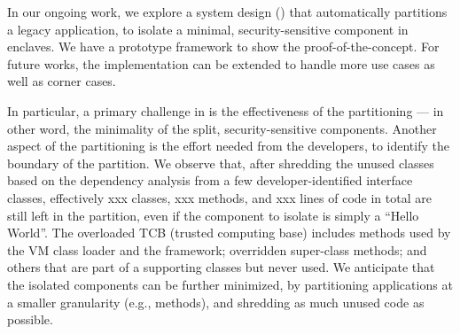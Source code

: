 %


In our ongoing work,
we explore a system design (\term{\civet{}}) that automatically partitions a legacy \java{} application,
to isolate a minimal, security-sensitive component
in \intel{} \sgx{} enclaves.
We have a prototype framework to show the proof-of-the-concept.
For future works,
the implementation can be extended to handle more use cases as well as corner cases.

In particular, a primary challenge in \civet{} is
the effectiveness of the partitioning
--- in other word, the minimality of the split, security-sensitive components.
Another aspect of the partitioning is the effort needed from the developers,
to identify the boundary of the partition.
We observe that, 
after shredding the unused classes based on the dependency analysis from a few developer-identified interface classes,
effectively
xxx classes, xxx methods,
and xxx lines of code in total 
are still left in the partition,
even if the component to isolate
is simply a ``Hello World''.
The overloaded TCB (trusted computing base) includes
methods used by the 
\java{} VM class loader and the \civet{} framework;
overridden super-class methods;
and others that are part of a supporting classes
but never used.
We anticipate that the isolated components
can be further minimized,
by partitioning applications at a smaller granularity (e.g., methods),
and shredding as much unused code as possible.


